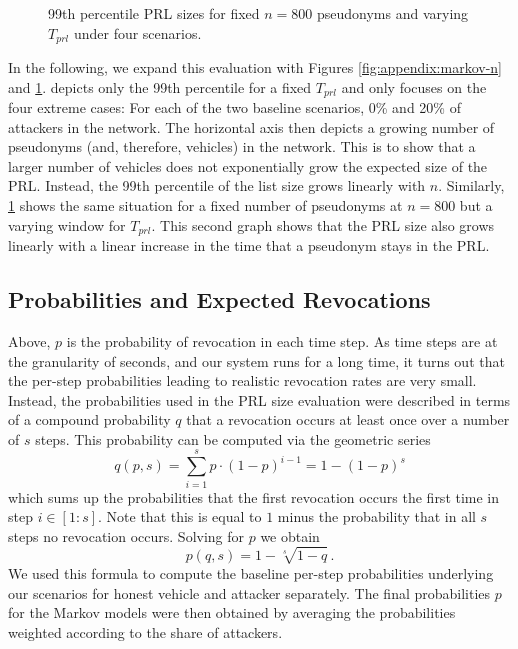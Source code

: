 \begin{figure}[t]
    \centering
    \resizebox{.83\linewidth}{!}{} 
    \caption{99th percentile PRL sizes for fixed $n=800$ pseudonyms and varying $T_{prl}$ under four scenarios.}
    \label{fig:appendix:markov-e}  
\end{figure}

In the following, we expand this evaluation with Figures
\ref{fig:appendix:markov-n} and \ref{fig:appendix:markov-e}.
 depicts only the 99th percentile for a fixed
$T_{prl}$ and only focuses on the four extreme cases: For each of the two
baseline scenarios, 0\% and 20\% of attackers in the network. The horizontal
axis then depicts a growing number of pseudonyms (and, therefore, vehicles) in
the network. This is to show that a larger number of vehicles does not
exponentially grow the expected size of the \ac{PRL}. Instead, the 99th
percentile of the list size grows linearly with $n$. Similarly,
\cref{fig:appendix:markov-e} shows the same situation for a fixed number of
pseudonyms at $n=800$ but a varying window for $T_{prl}$. This second graph
shows that the \ac{PRL} size also grows linearly with a linear increase in the
time that a pseudonym stays in the \ac{PRL}.

\subsection{Probabilities and Expected Revocations}

Above, $p$ is the probability of revocation in each time step. As time steps are at the granularity of seconds, and our system runs for a long time, it turns out that the per-step probabilities leading to realistic revocation rates are very small. Instead, the probabilities used in the \ac{PRL} size evaluation were described in terms of a compound probability $q$ that a revocation occurs at least once over a number of $s$ steps. This probability can be computed via the geometric series
\[q(p,s) = \sum_{i=1}^s p\cdot(1-p)^{i-1} = 1-(1-p)^s\] 
which sums up the probabilities that the first revocation occurs the first time in step $i\in[1:s]$. Note that this is equal to $1$ minus the probability that in all $s$ steps no revocation occurs. Solving for $p$ we obtain
\[p(q,s) = 1-\sqrt[s]{1-q}\,.\]
We used this formula to compute the baseline per-step probabilities underlying our scenarios for honest vehicle and attacker separately. The final probabilities $p$ for the Markov models were then obtained by averaging the probabilities weighted according to the share of attackers.


